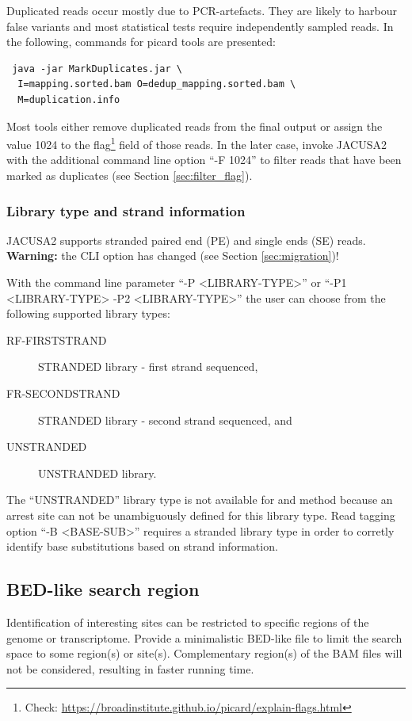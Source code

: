 \documentclass[10pt,a4paper,final]{article}
\begin{document}
Duplicated reads occur mostly due to PCR-artefacts. They are likely to harbour false variants and
most statistical tests require independently sampled reads. In the following, commands for picard 
tools are presented:
\begin{verbatim} java -jar MarkDuplicates.jar \
  I=mapping.sorted.bam O=dedup_mapping.sorted.bam \
  M=duplication.info
\end{verbatim}
Most tools either remove duplicated reads from the final output or assign the value 1024 to the flag\footnote{
Check: \url{https://broadinstitute.github.io/picard/explain-flags.html}} field of those reads. In the
later case, invoke JACUSA2 with the additional command line option ``-F 1024'' to filter reads that
have been marked as duplicates (see Section \ref{sec:filter_flag}).
\subsubsection{Library type and strand information}\label{sec:library_type}
JACUSA2 supports stranded paired end (PE) and single ends (SE) reads. \textbf{Warning:} the CLI option
has changed (see Section \ref{sec:migration})!

With the command line parameter ``-P <LIBRARY-TYPE>'' or ``-P1 <LIBRARY-TYPE> -P2 <LIBRARY-TYPE>''
the user can choose from the following supported library types:
\begin{description} 
\item[RF-FIRSTSTRAND] STRANDED library - first strand sequenced,
\item[FR-SECONDSTRAND] STRANDED library - second strand sequenced, and
\item[UNSTRANDED] UNSTRANDED library.
\end{description}
The ``UNSTRANDED'' library type is not available for \rtarrest and \lrtarrest method because an arrest 
site can not be unambiguously defined for this library type. Read tagging option 
``-B <BASE-SUB>'' requires a stranded library type in order to corretly identify base substitutions 
based on strand information.
\subsection{BED-like search region}
Identification of interesting sites can be restricted to specific regions of the genome or transcriptome.
Provide a minimalistic BED-like file to limit the search space to some region(s) or site(s). 
Complementary region(s) of the BAM files will not be considered, resulting in faster running time.
\end{document}
